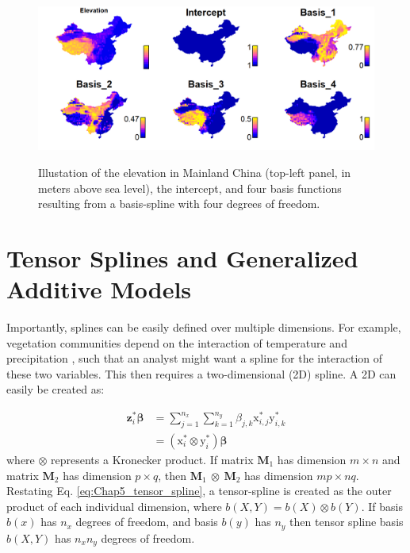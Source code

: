 \begin{figure}[!ht]
    \caption[Mapped basis functions using cubic splines for elevation]{Illustation of the elevation in Mainland China (top-left panel, in meters above sea level), the intercept, and four basis functions resulting from a basis-spline with four degrees of freedom.}
    \centering
    \includegraphics[width=5.5in]{Chap_5/Basis-Map.png}
    \label{fig:Chap5_Basis_maps}
\end{figure}

\section{Tensor Splines and Generalized Additive Models} \label{sec:Chap5_tensor_spliens}

Importantly, splines can be easily defined over multiple dimensions.  For example, vegetation communities depend on the interaction of temperature and precipitation \cite{ricklefs_economy_2008}, such that an analyst might want a spline for the interaction of these two variables.  This then requires a two-dimensional (2D) spline.  A 2D  can easily be created as:

\begin{equation} \label{eq:Chap5_tensor_spline}
\begin{split}
    \mathbf{z}_i^* \mathbf{\beta} & = \sum_{j=1}^{n_x} \sum_{k=1}^{n_y} \beta_{j,k} \mathrm{x}_{i,j}^* \mathrm{y}_{i,k}^* \\ & = ( \mathrm{x}_{i}^* \otimes \mathrm{y}_{i}^* ) \mathbf{\beta} 
\end{split}
\end{equation}
where \(\otimes\) represents a Kronecker product.  If matrix \(\mathbf{M}_1\) has dimension \( m \times n \) and matrix \(\mathbf{M}_2\) has dimension \( p \times q \), then  \( \mathbf{M}_1\ \otimes\ \mathbf{M}_2\) has dimension \( mp \times nq \).  Restating Eq. \ref{eq:Chap5_tensor_spline}, a tensor-spline is created as the outer product of each individual dimension, where \( b(X,Y) = b(X) \otimes b(Y) \).  If basis \(b(x)\) has \(n_x\) degrees of freedom, and basis \(b(y)\) has \(n_y\) then tensor spline basis \( b(X,Y) \) has \( n_x n_y \) degrees of freedom.

